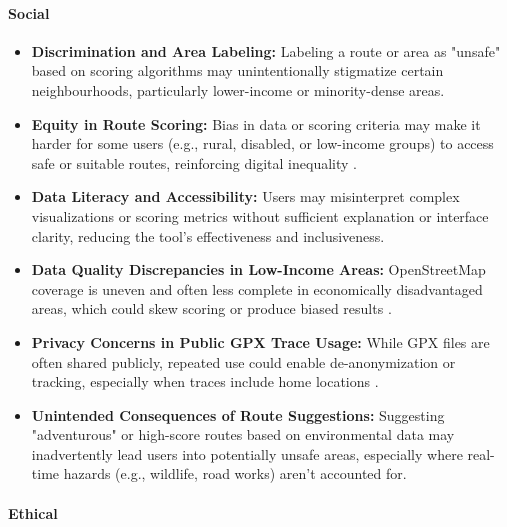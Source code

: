 \documentclass{article}
\begin{document}
\paragraph{Social}

\begin{itemize}
	\item \textbf{Discrimination and Area Labeling:} Labeling a route or area as "unsafe" based on scoring algorithms may unintentionally stigmatize certain neighbourhoods, particularly lower-income or minority-dense areas.
	\item \textbf{Equity in Route Scoring:} Bias in data or scoring criteria may make it harder for some users (e.g., rural, disabled, or low-income groups) to access safe or suitable routes, reinforcing digital inequality \citep{haklay2010vgi}.
	\item \textbf{Data Literacy and Accessibility:} Users may misinterpret complex visualizations or scoring metrics without sufficient explanation or interface clarity, reducing the tool’s effectiveness and inclusiveness.
	\item \textbf{Data Quality Discrepancies in Low-Income Areas:} OpenStreetMap coverage is uneven and often less complete in economically disadvantaged areas, which could skew scoring or produce biased results \citep{goodchild2007citizens}.
	\item \textbf{Privacy Concerns in Public GPX Trace Usage:} While GPX files are often shared publicly, repeated use could enable de-anonymization or tracking, especially when traces include home locations \citep{leszczynski2015spatial}.
	\item \textbf{Unintended Consequences of Route Suggestions:} Suggesting "adventurous" or high-score routes based on environmental data may inadvertently lead users into potentially unsafe areas, especially where real-time hazards (e.g., wildlife, road works) aren't accounted for.
\end{itemize}

\paragraph{Ethical}
\end{document}
